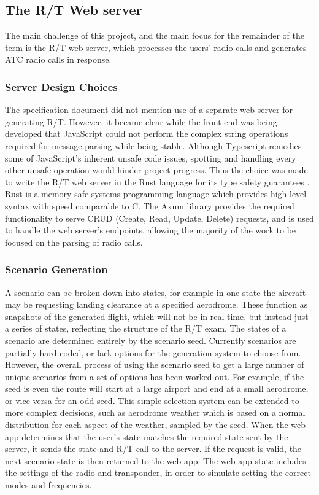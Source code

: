 \subsection{The R/T Web server}
The main challenge of this project, and the main focus for the remainder of the term is the R/T web server, which processes the users' radio calls and generates ATC radio calls in response.

\subsubsection{Server Design Choices}
The specification document did not mention use of a separate web server for generating R/T. However, it became clear while the front-end was being developed that JavaScript could not perform the complex string operations required for message parsing while being stable. Although Typescript remedies some of JavaScript's inherent unsafe code issues, spotting and handling every other unsafe operation would hinder project progress. Thus the choice was made to write the R/T web server in the Rust language for its type safety guarantees \cite{Rust}. Rust is a memory safe systems programming language which provides high level syntax with speed comparable to C. The Axum library \cite{Axum} provides the required functionality to serve CRUD (Create, Read, Update, Delete) requests, and is used to handle the web server's endpoints, allowing the majority of the work to be focused on the parsing of radio calls.

\subsubsection{Scenario Generation}
A scenario can be broken down into states, for example in one state the aircraft may be requesting landing clearance at a specified aerodrome. These function as snapshots of the generated flight, which will not be in real time, but instead just a series of states, reflecting the structure of the R/T exam. The states of a scenario are determined entirely by the scenario seed. Currently scenarios are partially hard coded, or lack options for the generation system to choose from. However, the overall process of using the scenario seed to get a large number of unique scenarios from a set of options has been worked out. For example, if the seed is even the route will start at a large airport and end at a small aerodrome, or vice versa for an odd seed. This simple selection system can be extended to more complex decisions, such as aerodrome weather which is based on a normal distribution for each aspect of the weather, sampled by the seed. When the web app determines that the user's state matches the required state sent by the server, it sends the state and R/T call to the server. If the request is valid, the next scenario state is then returned to the web app. The web app state includes the settings of the radio and transponder, in order to simulate setting the correct modes and frequencies.

